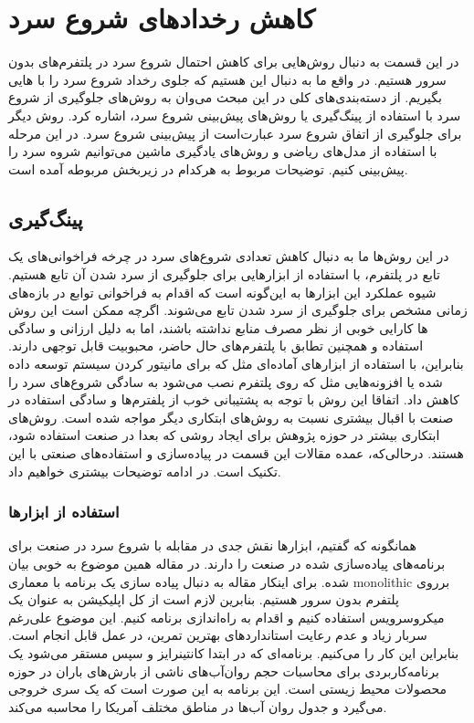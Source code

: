 \section{کاهش رخداد‌های شروع سرد}

در این قسمت به دنبال روش‌هایی برای کاهش احتمال شروع سرد در پلتفرم‌های بدون سرور هستیم. در واقع ما به دنبال این هستیم که جلوی رخداد شروع سرد را با هایی بگیریم. از دسته‌بندی‌های کلی در این مبحث می‌وان به روش‌های جلوگیری از شروع سرد با استفاده از پینگ‌گیری یا روش‌های پیش‌بینی شروع سرد، اشاره کرد. روش دیگر برای جلوگیری از اتفاق شروع سرد عبارت‌است از پیش‌بینی شروع سرد. در این مرحله با استفاده از مدل‌های ریاضی و روش‌های یادگیری ماشین می‌توانیم شروه سرد را پیش‌بینی کنیم. توضیحات مربوط به هرکدام در زیر‌بخش مربوطه آمده است. 


\subsection{پینگ‌گیری}

در این روش‌ها ما به دنبال کاهش تعدادی شروع‌های سرد در چرخه فراخوانی‌های یک تابع در پلتفرم، با استفاده از ابزارهایی برای جلوگیری از سرد شدن آن تابع هستیم. شیوه عملکرد این ابزارها به این‌گونه است که اقدام به فراخوانی توابع در بازه‌های زمانی مشخص برای جلوگیری از سرد شدن تابع می‌شوند. اگرچه ممکن است این روش ها کارایی خوبی از نظر مصرف منابع نداشته باشند، اما به دلیل ارزانی و سادگی استفاده و همچنین تطابق با پلتفرم‌های حال حاضر، محبوبیت قابل توجهی دارند. بنابراین، با استفاده از ابزارهای آماده‌ای مثل \cite{CloudWatch} که برای مانیتور کردن سیستم توسعه داده شده یا افزونه‌هایی مثل \cite{LambdaWarmer} که روی پلتفرم  نصب می‌شود به سادگی شروع‌های سرد را کاهش داد. اتفاقا این روش با توجه به پشتیبانی خوب از پلفترم‌ها و سادگی استفاده در صنعت با اقبال بیشتری نسبت به روش‌های ابتکاری دیگر مواجه شده است. روش‌های ابتکاری بیشتر در حوزه پژوهش برای ایجاد روشی که بعدا در صنعت استفاده شود، هستند. درحالی‌که، عمده مقالات این قسمت در پیاده‌سازی و استفاده‌های صنعتی با این تکنیک است. در ادامه توضیحات بیشتری خواهیم داد. 
\subsubsection{استفاده از ابزار‌ها}

همانگونه که گفتیم، ابزار‌ها نقش جدی در مقابله با شروع سرد در صنعت برای برنامه‌های پیاده‌سازی شده در صنعت را دارند. در مقاله \cite{lloyd2018improving} همین موضوع به خوبی بیان شده. برای اینکار مقاله به دنبال پیاده سازی یک برنامه‌ با معماری monolithic برروی پلتفرم بدون سرور هستیم. بنابرین لازم است از کل اپلیکیشن به عنوان یک میکروسرویس استفاده کنیم و اقدام به راه‌اندازی برنامه کنیم. این موضوع علی‌رغم سربار زیاد و عدم رعایت استاندارد‌های بهترین تمرین، در عمل قابل انجام است. بنابراین این کار را می‌کنیم. برنامه‌ای که در ابتدا کانتینرایز و سپس مستقر می‌شود یک برنامه‌کاربردی برای محاسبات حجم روان‌آب‌های ناشی از بارش‌های باران در حوزه محصولات محیط زیستی است. این برنامه به این صورت است که یک سری خروجی می‌گیرد و جدول روان آب‌ها در مناطق مختلف آمریکا را محاسبه می‌کند. 

